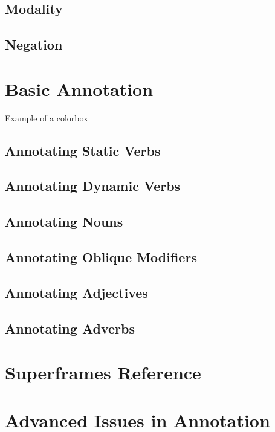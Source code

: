 \documentclass[a4paper]{article}
\begin{document}
\subsection{Modality}

\subsection{Negation}

\section{Basic Annotation}

\begin{tcolorbox}
    Example of a colorbox
\end{tcolorbox}

\subsection{Annotating Static Verbs}

\subsection{Annotating Dynamic Verbs}

\subsection{Annotating Nouns}

\subsection{Annotating Oblique Modifiers}

\subsection{Annotating Adjectives}

\subsection{Annotating Adverbs}

\section{Superframes Reference}

\section{Advanced Issues in Annotation}
\end{document}
